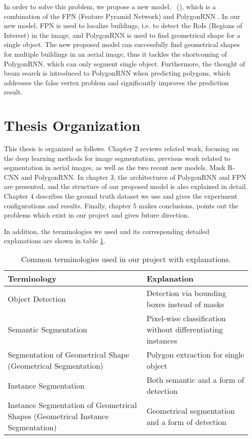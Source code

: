 In order to solve this problem, we propose a new model, \modelnameshort\ (\modelnamelong), which is a combination of the FPN (Feature Pyramid Network) \cite{fpn} and PolygonRNN \cite{polygonrnn}. In our new model, FPN is used to localize buildings, i.e. to detect the RoIs (Regions of Interest) in the image, and PolygonRNN is used to find geometrical shape for a single object. The new proposed model can successfully find geometrical shapes for multiple buildings in an aerial image, thus it tackles the shortcoming of PolygonRNN, which can only segment single object. Furthermore, the thought of beam search is introduced to PolygonRNN when predicting polygons, which addresses the false vertex problem and significantly improves the prediction result.

\newpage

\section{Thesis Organization}\label{thsorg}
This thesis is organized as follows. Chapter 2 reviews related work, focusing on the deep learning methods for image segmentation, previous work related to segmentation in aerial images, as well as the two recent new models, Mask R-CNN \cite{maskrcnn} and PolygonRNN. In chapter 3, the architectures of PolygonRNN and FPN are presented, and the structure of our proposed model is also explained in detail. Chapter 4 describes the ground truth dataset we use and gives the experiment configurations and results. Finally, chapter 5 makes conclusions, points out the problems which exist in our project and gives future direction.

In addition, the terminologies we used and its corresponding detailed explanations are shown in table \ref{tab:term}.

\begin{table}[ht!]
	\centering
	\caption[Common terminologies used in our project with explanations]{Common terminologies used in our project with explanations.}
	\label{tab:term}
	\begin{tabularx}{\textwidth}{X|X}
	\hline
	\textbf{Terminology} & \textbf{Explanation}\\ \hline
	Object Detection & Detection via bounding boxes instead of masks \\
	Semantic Segmentation & Pixel-wise classification without differentiating instances \\
	Segmentation of Geometrical Shape (Geometrical Segmentation) & Polygon extraction for single object \\ \hline
	Instance Segmentation & Both semantic and a form of detection \\
	Instance Segmentation of Geometrical Shapes (Geometrical Instance Segmentation) & Geometrical segmentation and a form of detection \\
	\hline
	\end{tabularx}
\end{table}

